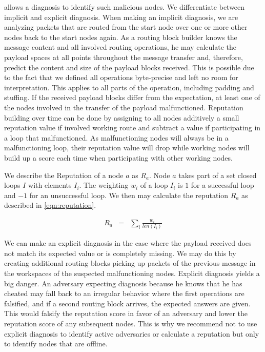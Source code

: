 \MessageVortex{} allows a diagnosis to identify such malicious nodes. We differentiate between implicit and explicit diagnosis. When making an implicit diagnosis, we are analyzing packets that are routed from the start node over one or more other nodes back to the start nodes again. As a routing block builder knows the message content and all involved routing operations, he may calculate the payload spaces at all points throughout the message transfer and, therefore, predict the content and size of the payload blocks received. This is possible due to the fact that we defined all operations byte-precise and left no room for interpretation. This applies to all parts of the operation, including padding and stuffing. If the received payload blocks differ from the expectation, at least one of the nodes involved in the transfer of the payload malfunctioned. Reputation building over time can be done by assigning to all nodes additively a small reputation value if involved working route and subtract a value if participating in a loop that malfunctioned. As malfunctioning nodes will always be in a malfunctioning loop, their reputation value will drop while working nodes will build up a score each time when participating with other working nodes.

We describe the Reputation of a node $a$ as $R_a$. Node $a$ takes part of a set closed loops $I$ with elements $I_i$. The weighting $w_i$ of a loop $I_i$ is $1$ for a successful loop and $-1$ for an unsuccessful loop. We then may calculate the reputation $R_a$ as described in \cref{eqn:reputation}.

\begin{eqnarray}
	R_a & = & \sum_{i}{\frac{w_i}{len\left(I_i\right)}}\label{eqn:reputation}
\end{eqnarray} 

We can make an explicit diagnosis in the case where the payload received does not match its expected value or is completely missing. We may do this by creating additional routing blocks picking up packets of the previous message in the workspaces of the suspected malfunctioning nodes. Explicit diagnosis yields a big danger. An adversary expecting diagnosis because he knows that he has cheated may fall back to an irregular behavior where the first operations are falsified, and if a second routing block arrives, the expected answers are given. This would falsify the reputation score in favor of an adversary and lower the reputation score of any subsequent nodes. This is why we recommend not to use explicit diagnosis to identify active adversaries or calculate a reputation but only to identify nodes that are offline.

